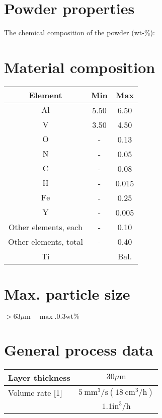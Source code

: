 \documentclass[10pt]{article}
\begin{document}
\section*{Powder properties}
The chemical composition of the powder (wt-\%):

\section*{Material composition}
\begin{center}
\begin{tabular}{ccc}
Element & Min & Max \\
\hline
$\mathrm{Al}$ & 5.50 & 6.50 \\
\hline
$\mathrm{V}$ & 3.50 & 4.50 \\
\hline
$\mathrm{O}$ & - & 0.13 \\
\hline
$\mathrm{N}$ & - & 0.05 \\
\hline
$\mathrm{C}$ & - & 0.08 \\
\hline
$\mathrm{H}$ & - & 0.015 \\
\hline
$\mathrm{Fe}$ & - & 0.25 \\
\hline
$\mathrm{Y}$ & - & 0.005 \\
\hline
Other elements, each & - & 0.10 \\
\hline
Other elements, total & - & 0.40 \\
\hline
Ti &  & Bal. \\
\hline
\end{tabular}
\end{center}

\section*{Max. particle size}
$>63 \mu \mathrm{m} \quad \max .0 .3 \mathrm{wt} \%$

\section*{General process data}
\begin{center}
\begin{tabular}{lc}
\hline
Layer thickness & $30 \mu \mathrm{m}$ \\
\hline
Volume rate [1] & $5 \mathrm{~mm}^{3} / \mathrm{s}\left(18 \mathrm{~cm}^{3} / \mathrm{h}\right)$ \\
 & $1.1 \mathrm{in}^{3} / \mathrm{h}$ \\
\end{tabular}
\end{center}
\end{document}

